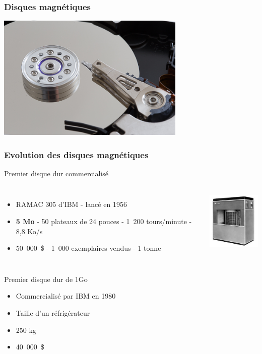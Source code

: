 \begin{frame}
\frametitle{Disques magnétiques}
\includegraphics[height=6cm]{../illustration/disque_dur.jpg}
\end{frame}

\begin{frame}
  \frametitle{Evolution des disques magnétiques}
  \begin{exampleblock}{Premier disque dur commercialisé}
    \begin{columns}
      \begin{itemize}
        \item RAMAC 305 d'IBM - lancé en 1956
        \item \textbf{5 Mo} - 50 plateaux de 24 pouces - 1~200 tours/minute - 8,8 Ko/s
        \item 50~000~\$ - 1~000 exemplaires vendus - 1 tonne
      \end{itemize}
        \includegraphics[height=3cm]{../illustration/ramac-305.jpg}
    \end{columns}
  \end{exampleblock}
  \begin{exampleblock}{Premier disque dur de 1Go}
    \begin{itemize}
      \item Commercialisé par IBM en 1980
      \item Taille d'un réfrigérateur
      \item 250 kg
      \item 40~000~\$
    \end{itemize}
  \end{exampleblock}
\end{frame}

